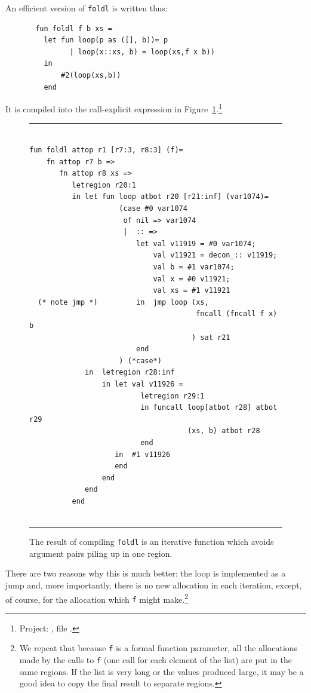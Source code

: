 \documentclass[12pt]{book}
\begin{document}
An efficient version of {\tt foldl} is written thus:
\begin{verbatim}
       fun foldl f b xs = 
         let fun loop(p as ([], b))= p
               | loop(x::xs, b) = loop(xs,f x b))
         in
             #2(loop(xs,b))
         end
\end{verbatim}
It is compiled into the  call-explicit expression in Figure~\ref{foldl.fig}.\footnote{Project:
, file .}
\begin{figure}
\hrule
\begin{verbatim}

fun foldl attop r1 [r7:3, r8:3] (f)= 
    fn attop r7 b => 
       fn attop r8 xs => 
          letregion r20:1 
          in let fun loop atbot r20 [r21:inf] (var1074)= 
                     (case #0 var1074 
                      of nil => var1074
                      |  :: => 
                         let val v11919 = #0 var1074; 
                             val v11921 = decon_:: v11919; 
                             val b = #1 var1074; 
                             val x = #0 v11921; 
                             val xs = #1 v11921
  (* note jmp *)         in  jmp loop (xs, 
                                       fncall (fncall f x) b
                                      ) sat r21
                         end 
                     ) (*case*) 
             in  letregion r28:inf 
                 in let val v11926 = 
                          letregion r29:1 
                          in funcall loop[atbot r28] atbot r29
                                     (xs, b) atbot r28 
                          end
                    in  #1 v11926
                    end  
                 end
             end  
          end
 
\end{verbatim}
\caption{The result of compiling {\tt foldl} is an iterative function which avoids
argument pairs piling up in one region.}
\medskip
\hrule
\label{foldl.fig}
\end{figure}
There are two reasons why this is much better: the loop is implemented as a jump and,
more importantly, there
is no new allocation in each iteration, except, of course,  for
the allocation which {\tt f} might make.\footnote{We repeat
that because {\tt f} is a formal function parameter, all the
allocations made by the calls to {\tt f} (one call for each element of the list)
are put in the same regions. If the list is very long or the values produced large,
it may be a good idea to copy the final result to separate regions.}
\end{document}
